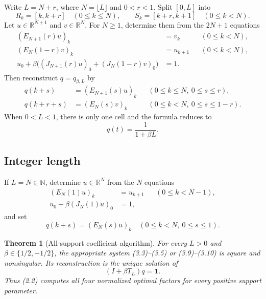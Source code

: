 \documentclass[11pt]{article}
\newtheorem{theorem}{Theorem}
\theoremstyle{definition}
\theoremstyle{remark}
\newcommand{\1}{\mathbf 1}
\newcommand{\R}{\mathbb R}
\begin{document}
Write $L=N+r$, where $N=\lfloor L\rfloor$ and $0<r<1$. Split $[0,L]$ into
\[
 R_k=[k,k+r]\quad(0\leq k\leq N),\qquad
 S_k=[k+r,k+1]\quad(0\leq k<N).                          \tag{3.2}
\]
Let $u\in\R^{N+1}$ and $v\in\R^N$. For $N\geq1$, determine them from the
$2N+1$ equations
\begin{align}
 (E_{N+1}(r)u)_k&=v_k
        &&(0\leq k<N),                                   \tag{3.3}\\
 (E_N(1-r)v)_k&=u_{k+1}
        &&(0\leq k<N),                                   \tag{3.4}\\
 u_0+\beta\big((J_{N+1}(r)u)_0+(J_N(1-r)v)_0\big)&=1.
                                                               \tag{3.5}
\end{align}
Then reconstruct $q=q_{\beta,L}$ by
\begin{align}
 q(k+s)&=(E_{N+1}(s)u)_k
       &&(0\leq k\leq N,\ 0\leq s\leq r),                \tag{3.6}\\
 q(k+r+s)&=(E_N(s)v)_k
       &&(0\leq k<N,\ 0\leq s\leq1-r).                   \tag{3.7}
\end{align}
When $0<L<1$, there is only one cell and the formula reduces to
\[
 q(t)=\frac{1}{1+\beta L}.                               \tag{3.8}
\]

\subsection{Integer length}

If $L=N\in\mathbb N$, determine $u\in\R^N$ from the $N$ equations
\begin{align}
 (E_N(1)u)_k&=u_{k+1}
       &&(0\leq k<N-1),                                  \tag{3.9}\\
 u_0+\beta(J_N(1)u)_0&=1,                                \tag{3.10}
\end{align}
and set
\[
 q(k+s)=(E_N(s)u)_k
 \quad(0\leq k<N,\ 0\leq s\leq1).                        \tag{3.11}
\]

\begin{theorem}[All-support coefficient algorithm]\label{thm:algorithm}
For every $L>0$ and $\beta\in\{1/2,-1/2\}$, the appropriate system
\emph{(3.3)--(3.5)} or \emph{(3.9)--(3.10)} is square and nonsingular. Its
reconstruction is the unique solution of
\[
 (I+\beta T_L)q=\1.                                      \tag{3.12}
\]
Thus \emph{(2.2)} computes all four normalized optimal factors for every
positive support parameter.
\end{theorem}
\end{document}
